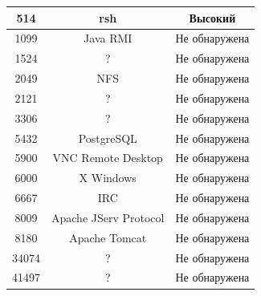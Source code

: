 \begin{table}[H]
\begin{tabular}{ccc}
		\multicolumn{1}{|c|}{514}   & \multicolumn{1}{c|}{rsh}                         & \multicolumn{1}{c|}{Высокий}                         \\ \hline
		\multicolumn{1}{|c|}{1099}  & \multicolumn{1}{c|}{Java RMI}                    & \multicolumn{1}{c|}{Не обнаружена}                   \\ \hline
		\multicolumn{1}{|c|}{1524}  & \multicolumn{1}{c|}{?}                           & \multicolumn{1}{c|}{Не обнаружена}                   \\ \hline
		\multicolumn{1}{|c|}{2049}  & \multicolumn{1}{c|}{NFS}                         & \multicolumn{1}{c|}{Не обнаружена}                   \\ \hline
		\multicolumn{1}{|c|}{2121}  & \multicolumn{1}{c|}{?}                           & \multicolumn{1}{c|}{Не обнаружена}                   \\ \hline
		\multicolumn{1}{|c|}{3306}  & \multicolumn{1}{c|}{?}                           & \multicolumn{1}{c|}{Не обнаружена}                   \\ \hline
		\multicolumn{1}{|c|}{5432}  & \multicolumn{1}{c|}{PostgreSQL}                  & \multicolumn{1}{c|}{Не обнаружена}                   \\ \hline
		\multicolumn{1}{|c|}{5900}  & \multicolumn{1}{c|}{VNC Remote Desktop}          & \multicolumn{1}{c|}{Не обнаружена}                   \\ \hline
		\multicolumn{1}{|c|}{6000}  & \multicolumn{1}{c|}{X Windows}                   & \multicolumn{1}{c|}{Не обнаружена}                   \\ \hline
		\multicolumn{1}{|c|}{6667}  & \multicolumn{1}{c|}{IRC}                         & \multicolumn{1}{c|}{Не обнаружена}                   \\ \hline
		\multicolumn{1}{|c|}{8009}  & \multicolumn{1}{c|}{Apache JServ Protocol}       & \multicolumn{1}{c|}{Не обнаружена}                   \\ \hline
		\multicolumn{1}{|c|}{8180}  & \multicolumn{1}{c|}{Apache Tomcat}               & \multicolumn{1}{c|}{Не обнаружена}                   \\ \hline
		\multicolumn{1}{|c|}{34074} & \multicolumn{1}{c|}{?}                           & \multicolumn{1}{c|}{Не обнаружена}                   \\ \hline
		\multicolumn{1}{|c|}{41497} & \multicolumn{1}{c|}{?}                           & \multicolumn{1}{c|}{Не обнаружена}                   \\ \hline

\end{tabular}
\end{table}
